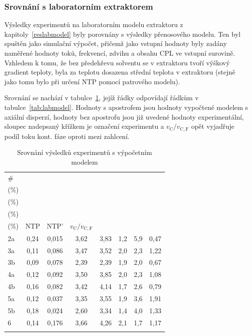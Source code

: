 \subsubsection{Srovnání s laboratorním extraktorem} \label{rescompare}
Výsledky experimentů na laboratorním modelu extraktoru z kapitoly~\ref{reslabmodel} byly porovnány s výsledky přenosového modelu.
Ten byl spuštěn jako simulační výpočet, přičemž jako vstupní hodnoty byly zadány naměřené hodnoty toků, frekvencí, zdvihu a obsahu CPL ve vstupní surovině.
Vzhledem k tomu, že bez předehřevu solventu se v extraktoru tvoří výškový gradient teploty, byla za teplotu dosazena střední teplota v extraktoru (stejně jako tomu bylo při určení NTP pomocí patrového modelu).

Srovnání se nachází v tabulce~\ref{tab:labmodelcompare}, jejíž řádky odpovídají řádkům v tabulce~\ref{tab:labmodel}.
Hodnoty s apostrofem jsou hodnoty vypočtené modelem s axiální disperzí, hodnoty bez apostrofu jsou již uvedené hodnoty experimentální, sloupec nadepsaný křížkem je označení experimentu a $v_\mathrm{C} / v_\mathrm{C,F}$ opět vyjadřuje podíl toku kont. fáze oproti mezi zahlcení.
\begin{table}[ht]
\caption{Srovnání výsledků experimentů s výpočetním modelem} \label{tab:labmodelcompare}
\begin{center}
\begin{tabular}{lccccccc}
	\Xhline{2pt} \# &
	\makecell{$w_\mathrm{R}$ \\ (\%)} & \makecell{$w_\mathrm{R}'$ \\ (\%)} &
	\makecell{$u_\mathrm{E}$ \\ (\%)} & \makecell{$u_\mathrm{E}'$ \\ (\%)} &
	NTP & NTP' & $v_\mathrm{C} / v_\mathrm{C,F}$\\ \hline
	2a & 0,24 & 0,015 & 3,62 & 3,83 & 1,2 & 5,9 & 0,47 \\
	3a & 0,11 & 0,086 & 3,47 & 3,52 & 2,0 & 2,3 & 1,22 \\
	3b & 0,09 & 0,078 & 2,39 & 2,39 & 1,9 & 2,0 & 0,67 \\
	4a & 0,12 & 0,092 & 3,50 & 3,85 & 2,0 & 2,3 & 1,08 \\
	4b & 0,16 & 0,082 & 3,42 & 4,14 & 1,7 & 2,6 & 0,79 \\
	5a & 0,12 & 0,037 & 3,35 & 3,55 & 1,9 & 3,6 & 1,91 \\
	5b & 0,18 & 0,024 & 2,60 & 3,34 & 1,4 & 4,0 & 1,33 \\
	6  & 0,14 & 0,176 & 3,66 & 4,26 & 2,1 & 1,7 & 1,17 \\
	\Xhline{2pt}
\end{tabular}
\end{center}
\end{table}

